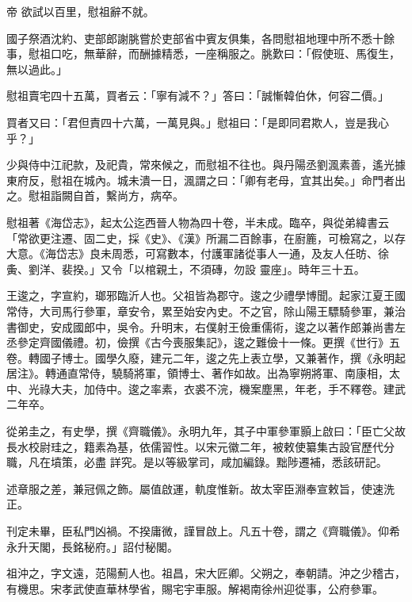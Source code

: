 \begin{pinyinscope}
 帝
 欲試以百里，慰祖辭不就。



 國子祭酒沈約、吏部郎謝朓嘗於吏部省中賓友俱集，各問慰祖地理中所不悉十餘事，慰祖口吃，無華辭，而酬據精悉，一座稱服之。朓歎曰：「假使班、馬復生，無以過此。」



 慰祖賣宅四十五萬，買者云：「寧有減不？」答曰：「誠慚韓伯休，何容二價。」



 買者又曰：「君但責四十六萬，一萬見與。」慰祖曰：「是即同君欺人，豈是我心乎？」



 少與侍中江祀款，及祀貴，常來候之，而慰祖不往也。與丹陽丞劉渢素善，遙光據東府反，慰祖在城內。城未潰一日，渢謂之曰：「卿有老母，宜其出矣。」命門者出之。慰祖詣闕自首，繫尚方，病卒。



 慰祖著《海岱志》，起太公迄西晉人物為四十卷，半未成。臨卒，與從弟緯書云「常欲更注遷、固二史，採《史》、《漢》所漏二百餘事，在廚簏，可檢寫之，以存大意。《海岱志》良未周悉，可寫數本，付護軍諸從事人一通，及友人任昉、徐夤、劉洋、裴揆。」又令「以棺親土，不須磚，勿設
 靈座」。時年三十五。



 王逡之，字宣約，瑯邪臨沂人也。父祖皆為郡守。逡之少禮學博聞。起家江夏王國常侍，大司馬行參軍，章安令，累至始安內史。不之官，除山陽王驃騎參軍，兼治書御史，安成國郎中，吳令。升明末，右僕射王儉重儒術，逡之以著作郎兼尚書左丞參定齊國儀禮。初，儉撰《古今喪服集記》，逡之難儉十一條。更撰《世行》五卷。轉國子博士。國學久廢，建元二年，逡之先上表立學，又兼著作，撰《永明起居注》。轉通直常侍，驍騎將軍，領博士、著作如故。出為寧朔將軍、南康相，太中、光祿大夫，加侍中。逡之率素，衣裘不浣，機案塵黑，年老，手不釋卷。建武二年卒。



 從弟圭之，有史學，撰《齊職儀》。永明九年，其子中軍參軍顥上啟曰：「臣亡父故長水校尉珪之，籍素為基，依儒習性。以宋元徽二年，被敕使纂集古設官歷代分職，凡在墳策，必盡
 詳究。是以等級掌司，咸加編錄。黜陟遷補，悉該研記。



 述章服之差，兼冠佩之飾。屬值啟運，軌度惟新。故太宰臣淵奉宣敕旨，使速洗正。



 刊定未畢，臣私門凶禍。不揆庸微，謹冒啟上。凡五十卷，謂之《齊職儀》。仰希永升天閣，長銘秘府。」詔付秘閣。



 祖沖之，字文遠，范陽薊人也。祖昌，宋大匠卿。父朔之，奉朝請。沖之少稽古，有機思。宋孝武使直華林學省，賜宅宇車服。解褐南徐州迎從事，公府參軍。




\end{pinyinscope}
